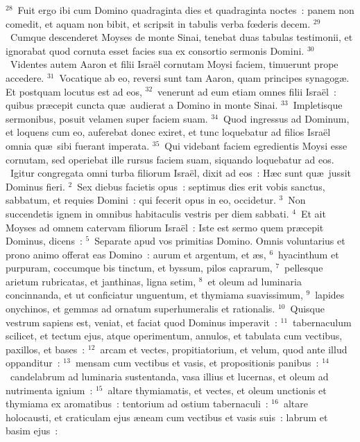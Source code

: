 ${}^{28}$~Fuit ergo ibi cum Domino quadraginta dies et quadraginta noctes~: panem non comedit, et aquam non bibit, et scripsit in tabulis verba fœderis decem.
${}^{29}$~Cumque descenderet Moyses de monte Sinai, tenebat duas tabulas testimonii, et ignorabat quod cornuta esset facies sua ex consortio sermonis Domini.
${}^{30}$~Videntes autem Aaron et filii Isra\"el cornutam Moysi faciem, timuerunt prope accedere.
${}^{31}$~Vocatique ab eo, reversi sunt tam Aaron, quam principes synagog\ae . Et postquam locutus est ad eos,
${}^{32}$~venerunt ad eum etiam omnes filii Isra\"el~: quibus pr\ae cepit cuncta qu\ae\ audierat a Domino in monte Sinai.
${}^{33}$~Impletisque sermonibus, posuit velamen super faciem suam.
${}^{34}$~Quod ingressus ad Dominum, et loquens cum eo, auferebat donec exiret, et tunc loquebatur ad filios Isra\"el omnia qu\ae\ sibi fuerant imperata.
${}^{35}$~Qui videbant faciem egredientis Moysi esse cornutam, sed operiebat ille rursus faciem suam, siquando loquebatur ad eos.
~Igitur congregata omni turba filiorum Isra\"el, dixit ad eos~: H\ae c sunt qu\ae\ jussit Dominus fieri.
${}^{2}$~Sex diebus facietis opus~: septimus dies erit vobis sanctus, sabbatum, et requies Domini~: qui fecerit opus in eo, occidetur.
${}^{3}$~Non succendetis ignem in omnibus habitaculis vestris per diem sabbati.
${}^{4}$~Et ait Moyses ad omnem catervam filiorum Isra\"el~: Iste est sermo quem pr\ae cepit Dominus, dicens~:
${}^{5}$~Separate apud vos primitias Domino. Omnis voluntarius et prono animo offerat eas Domino~: aurum et argentum, et \ae s,
${}^{6}$~hyacinthum et purpuram, coccumque bis tinctum, et byssum, pilos caprarum,
${}^{7}$~pellesque arietum rubricatas, et janthinas, ligna setim,
${}^{8}$~et oleum ad luminaria concinnanda, et ut conficiatur unguentum, et thymiama suavissimum,
${}^{9}$~lapides onychinos, et gemmas ad ornatum superhumeralis et rationalis.
${}^{10}$~Quisque vestrum sapiens est, veniat, et faciat quod Dominus imperavit~:
${}^{11}$~tabernaculum scilicet, et tectum ejus, atque operimentum, annulos, et tabulata cum vectibus, paxillos, et bases~:
${}^{12}$~arcam et vectes, propitiatorium, et velum, quod ante illud oppanditur~:
${}^{13}$~mensam cum vectibus et vasis, et propositionis panibus~:
${}^{14}$~candelabrum ad luminaria sustentanda, vasa illius et lucernas, et oleum ad nutrimenta ignium~:
${}^{15}$~altare thymiamatis, et vectes, et oleum unctionis et thymiama ex aromatibus~: tentorium ad ostium tabernaculi~:
${}^{16}$~altare holocausti, et craticulam ejus \ae neam cum vectibus et vasis suis~: labrum et basim ejus~:
